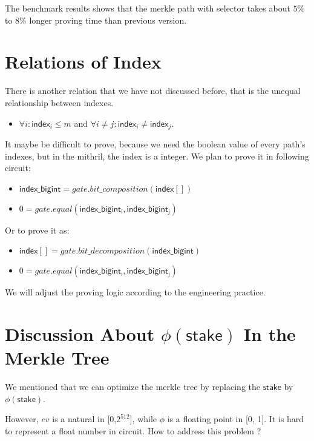 \documentclass{article}
\begin{document}
The benchmark results shows that the merkle path with selector takes about $5\%$ to $8\%$ longer proving time than previous version.

\section{Relations of Index}

There is another relation that we have not discussed before, that is the unequal relationship between indexes.
\begin{itemize}
    \item $\forall i : \mathsf{index}_i \leq m$ and $\forall i \neq j : \mathsf{index}_i \neq \mathsf{index}_j$.
\end{itemize}

It maybe be difficult to prove, because we need the boolean value of every path's indexes, but in the mithril, the index is a integer. We plan to prove it in following circuit:

\begin{itemize}
    \item $\mathsf{index\_bigint} = gate.bit\_composition(\mathsf{index[]})$
    \item $0 = gate.equal(\mathsf{index\_bigint_i,index\_bigint_j})$
\end{itemize}

Or to prove it as:

\begin{itemize}
    \item $\mathsf{index[]} = gate.bit\_decomposition(\mathsf{index\_bigint})$
    \item $0 = gate.equal(\mathsf{index\_bigint_i,index\_bigint_j})$
\end{itemize}

We will adjust the proving logic according to the engineering practice.



\section{Discussion About $\phi(\mathsf{stake})$ In the Merkle Tree}

We mentioned that we can optimize the merkle tree by replacing the $\mathsf{stake}$ by $\phi(\mathsf{stake})$. 

However, $ev$ is a natural in [0,$2^{512}$], while $\phi$ is a floating point in [0, 1]. It is hard to represent a float number in circuit. How to address this problem ?
\end{document}
